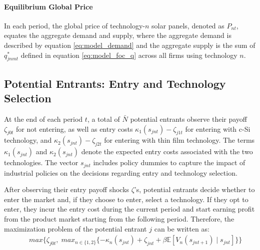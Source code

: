 \documentclass[12pt, letter]{article}
\begin{document}

\paragraph{Equilibrium Global Price}
In each period, the global price of technology-$n$ solar panels, denoted as $P_{nt}$, equates the aggregate demand and supply, where the aggregate demand is described by equation \eqref{eq:model_demand} and the aggregate supply is the sum of $q_{jnmt}^*$ defined in equation \eqref{eq:model_foc_q} across all firms using technology $n$.  

\subsection{Potential Entrants: Entry and Technology Selection}
At the end of each period $t$, a total of $\bar N$ potential entrants observe their payoff $\zeta_{j0t}$ for not entering, as well as entry costs $\kappa_1(s_{jnt})-\zeta_{j1t}$ for entering with c-Si technology, and $\kappa_2(s_{jnt})-\zeta_{j2t}$ for entering with thin film technology. The terms $\kappa_1(s_{jnt})$ and $\kappa_2(s_{jnt})$ denote the expected entry costs associated with the two technologies. The vector $s_{jnt}$ includes policy dummies to capture the impact of industrial policies on the decisions regarding entry and technology selection.

After observing their entry payoff shocks $\zeta$'s, potential entrants decide whether to enter the market and, if they choose to enter, select a technology. If they opt to enter, they incur the entry cost during the current period and start earning profit from the product market starting from the following period. Therefore, the maximization problem of the potential entrant $j$ can be written as:
\begin{eqnarray}
 && max\Big\{\zeta_{j0t}, \; max_{n\in \{1,2\}} \{-\kappa_n(s_{jnt}) + \zeta_{jnt} + \beta \mathbb{E}[V_n(s_{jnt+1}) \mid s_{jnt}]\} \Big\}
\end{eqnarray}
\end{document}

